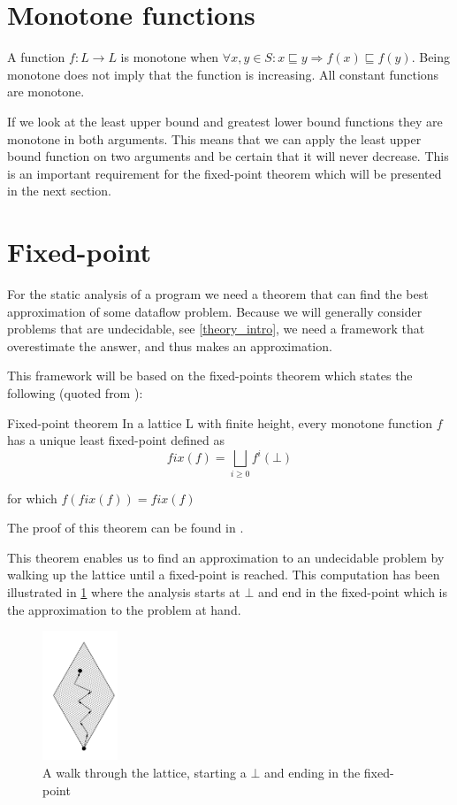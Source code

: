 \section{Monotone functions}
A function $f: L \to L$ is monotone when $\forall x,y \in S : x \sqsubseteq y \Rightarrow f(x) \sqsubseteq f(y)$.
Being monotone does not imply that the function is increasing.
All constant functions are monotone.

If we look at the least upper bound and greatest lower bound functions they are monotone in both arguments.
This means that we can apply the least upper bound function on two arguments and be certain that it will never decrease.
This is an important requirement for the fixed-point theorem which will be presented in the next section.

\section{Fixed-point}
For the static analysis of a program we need a theorem that can find the best approximation of some dataflow problem.
Because we will generally consider problems that are undecidable, see \cref{theory_intro}, we need a framework that overestimate the answer, and thus makes an approximation.

This framework will be based on the fixed-points theorem which states the following (quoted from \citet[p.~13]{schwartzbach}):

\begin{definition}{Fixed-point theorem}
In a lattice L with finite height, every monotone function $f$ has a unique least fixed-point defined as
\[ fix(f) = \bigsqcup_{i \ge 0} f^i(\bot) \]

for which $f(fix(f)) = fix(f)$
\end{definition}

\noindent
The proof of this theorem can be found in \citep[p.~13]{schwartzbach}.

This theorem enables us to find an approximation to an undecidable problem by walking up the lattice until a fixed-point is reached.
This computation has been illustrated in \cref{lattice_walk} where the analysis starts at $\bot$ and end in the fixed-point which is the approximation to the problem at hand.

\begin{figure}
\begin{center}
\includegraphics[width=0.2\textwidth]{figures/fixed-point_walk}
\end{center}
\caption{A walk through the lattice, starting a $\bot$ and ending in the fixed-point}
\label{lattice_walk}
\end{figure}

